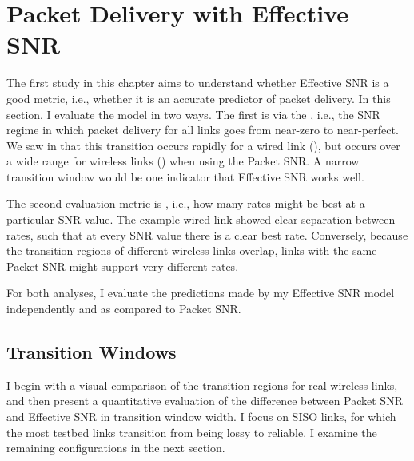 \section{Packet Delivery with Effective SNR}
The first study in this chapter aims to understand whether Effective SNR is a good metric, i.e., whether it is an accurate predictor of packet delivery. In this section, I evaluate the model in two ways. The first is via the , i.e., the SNR regime in which packet delivery for all links goes from near-zero to near-perfect. We saw in  that this transition occurs rapidly for a wired link (), but occurs over a wide range for wireless links () when using the Packet SNR. A narrow transition window would be one indicator that Effective SNR works well.

The second evaluation metric is , i.e., how many rates might be best at a particular SNR value. The example wired link showed clear separation between rates, such that at every SNR value there is a clear best rate. Conversely, because the transition regions of different wireless links overlap, links with the same Packet SNR might support very different rates. 

For both analyses, I evaluate the predictions made by my Effective SNR model independently and as compared to Packet SNR.

\subsection{Transition Windows}
I begin with a visual comparison of the transition regions for real wireless links, and then present a quantitative evaluation of the difference between Packet SNR and Effective SNR in transition window width. I focus on SISO links, for which the most testbed links transition from being lossy to reliable. I examine the remaining configurations in the next section.


